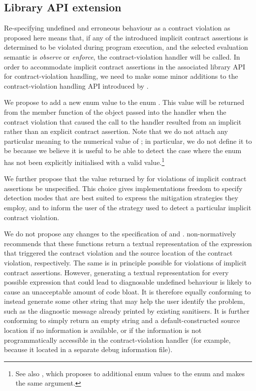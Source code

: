 \subsection{Library API extension}
\label{lib}

Re-specifying undefined and erroneous behaviour as a contract violation as proposed here means that, if any of the introduced implicit contract assertions is determined to be violated during program execution, and the selected evaluation semantic is \emph{observe} or \emph{enforce}, the contract-violation handler will be called. In order to accommodate implicit contract assertions in the associated library API for contract-violation handling, we need to make some minor additions to the contract-violation handling API introduced by \cite{P2900R9}.

We propose to add a new enum value  to the enum . This value will be returned from the  member function of the  object passed into the handler when the contract violation that caused the call to the handler resulted from an implicit rather than an explicit contract assertion. Note that we do not attach any particular meaning to the numerical value of ; in particular, we do not define it to be  because we believe it is useful to be able to detect the case where the enum has not been explicitly initialised with a valid value.\footnote{See also \cite{P3227R0}, which proposes to additional enum values to the enum  and makes the same argument.}

We further propose that the value returned by  for violations of implicit contract assertions be unspecified. This choice gives implementations freedom to specify detection modes that are best suited to express the mitigation strategies they employ, and to inform the user of the strategy used to detect a particular implicit contract violation. 

We do not propose any changes to the specification of  and . \cite{P2900R9} non-normatively recommends that these functions return a textual representation of the expression that triggered the contract violation and the source location of the contract violation, respectively. The same is in principle possible for violations of implicit contract assertions. However, generating a textual representation for every possible expression that could lead to diagnosable
undefined behaviour is likely to cause an unacceptable amount of code bloat. It is therefore equally conforming to instead generate some other string that may help the user identify the problem, such as the diagnostic message already printed by existing sanitisers. It is further conforming to simply return an empty string and a default-constructed source location if no information is available, or if the information is not programmatically accessible in the contract-violation handler (for example,
because it located in a separate debug information file). 

